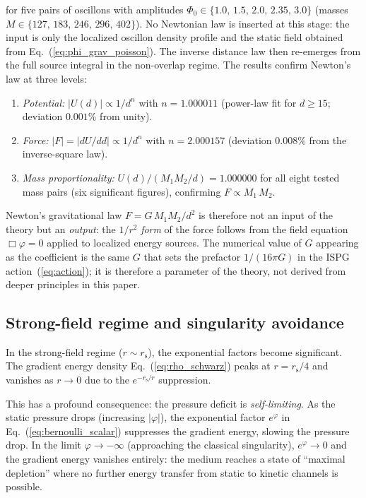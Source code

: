 \documentclass[aps,prd,onecolumn,superscriptaddress,nofootinbib,showpacs,12pt,notitlepage]{revtex4-2}
\newcommand{\rs}{r_{\mathrm{s}}}
\begin{document}
for five pairs of oscillons with amplitudes
$\Phi_0 \in \{1.0,\,1.5,\,2.0,\,2.35,\,3.0\}$
(masses $M \in \{127,\,183,\,246,\,296,\,402\}$).
No Newtonian law is inserted at this stage: the input is only
the localized oscillon density profile and the static field
obtained from Eq.~(\ref{eq:phi_grav_poisson}).  The inverse
distance law then re-emerges from the full source integral in
the non-overlap regime.
The results confirm Newton's law at three levels:
\begin{enumerate}
  \item \textit{Potential:} $|U(d)| \propto 1/d^{n}$
    with $n = 1.000011$ (power-law fit for $d \geq 15$;
    deviation $0.001\%$ from unity).
  \item \textit{Force:} $|F| = |dU/dd| \propto 1/d^{n}$
    with $n = 2.000157$ (deviation $0.008\%$ from the
    inverse-square law).
  \item \textit{Mass proportionality:}
    $U(d)/(M_1 M_2/d) = 1.000000$ for all eight tested
    mass pairs (six significant figures), confirming
    $F \propto M_1\,M_2$.
\end{enumerate}
Newton's gravitational law $F = G\,M_1 M_2/d^{2}$
is therefore not an input of the theory but an
\emph{output}: the $1/r^{2}$ \emph{form} of the force follows
from the field equation $\Box\varphi = 0$ applied to localized
energy sources.  The numerical value of $G$ appearing as the
coefficient is the same $G$ that sets the prefactor
$1/(16\pi G)$ in the ISPG action~(\ref{eq:action}); it is
therefore a parameter of the theory, not derived from deeper
principles in this paper.

\subsection{Strong-field regime and singularity avoidance}
\label{sec:strong_bernoulli}

In the strong-field regime ($r \sim \rs$), the exponential
factors become significant.  The gradient energy density
Eq.~(\ref{eq:rho_schwarz}) peaks at $r = \rs/4$ and
vanishes as $r \to 0$ due to the $e^{-\rs/r}$ suppression.

This has a profound consequence: the pressure deficit
is \emph{self-limiting}.  As the static pressure drops
(increasing $|\varphi|$), the exponential factor
$e^{\varphi}$ in Eq.~(\ref{eq:bernoulli_scalar})
suppresses the gradient energy, slowing the pressure
drop.  In the limit $\varphi \to -\infty$ (approaching
the classical singularity), $e^{\varphi} \to 0$ and the
gradient energy vanishes entirely: the medium reaches a
state of ``maximal depletion'' where no further energy
transfer from static to kinetic channels is possible.
\end{document}

